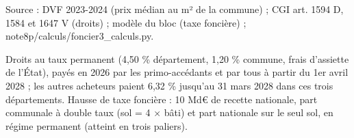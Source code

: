 Source : DVF 2023-2024 (prix médian au m² de la commune) ; CGI art. 1594 D, 1584 et 1647 V (droits) ; modèle du bloc (taxe foncière) ; note8p/calculs/foncier3\_calculs.py.\par Droits au taux permanent (4,50 \% département, 1,20 \% commune, frais d'assiette de l'État), payés en 2026 par les primo-accédants et par tous à partir du 1er avril 2028 ; les autres acheteurs paient 6,32 \% jusqu'au 31 mars 2028 dans ces trois départements. Hausse de taxe foncière : 10 Md€ de recette nationale, part communale à double taux (sol = 4 × bâti) et part nationale sur le seul sol, en régime permanent (atteint en trois paliers).

